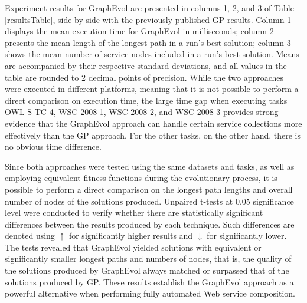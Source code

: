 \documentclass{article}
\begin{document}
Experiment results for GraphEvol are presented in columns 1, 2, and 3 of Table \ref{resultsTable}, side by side with the previously published GP results. Column 1 displays the mean execution time for GraphEvol in milliseconds; column 2 presents the mean length of the longest path in a run's best solution; column 3 shows the mean number of service nodes included in a run's
best solution. Means are accompanied by their respective standard deviations, and all values in the table are rounded to 2 decimal points of precision. While the two approaches were executed in different platforms, meaning that it is not possible to
perform a direct comparison on execution time, the large time gap when executing tasks OWL-S TC-4, WSC 2008-1, WSC 2008-2, and WSC-2008-3 provides strong evidence that the GraphEvol approach can handle certain service collections more effectively than the GP approach. For the other tasks, on the other hand, there is no obvious time difference.

Since both approaches were tested using the same datasets and tasks, as well as employing equivalent fitness functions during the evolutionary process, it is possible to perform a direct comparison on the longest path lengths and overall number of nodes of the solutions produced. Unpaired t-tests at 0.05 significance level were conducted to verify whether there are statistically
significant differences between the results produced by each technique. Such differences are denoted using $\uparrow$ for significantly higher results and $\downarrow$ for significantly lower. The tests revealed that GraphEvol yielded solutions with equivalent or significantly smaller longest paths and numbers of nodes, that is, the quality of the solutions produced by GraphEvol always matched or surpassed that of the solutions produced by GP. These results establish the GraphEvol approach as a powerful alternative when performing fully automated Web service composition.

\end{document}
